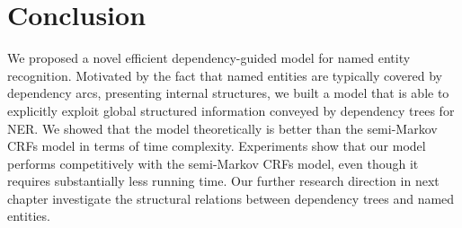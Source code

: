 \section{Conclusion}
We proposed a novel efficient dependency-guided model for named entity recognition.
Motivated by the fact that named entities are typically covered by dependency arcs, presenting internal structures, we built a model that is able to explicitly exploit global structured information conveyed by dependency trees for NER.
We showed that the model theoretically is better than the semi-Markov CRFs model in terms of time complexity.
Experiments show that our model performs competitively with the semi-Markov CRFs model, even though it requires substantially less running time. 
Our further research direction in next chapter investigate the structural relations between dependency trees and named entities. 



